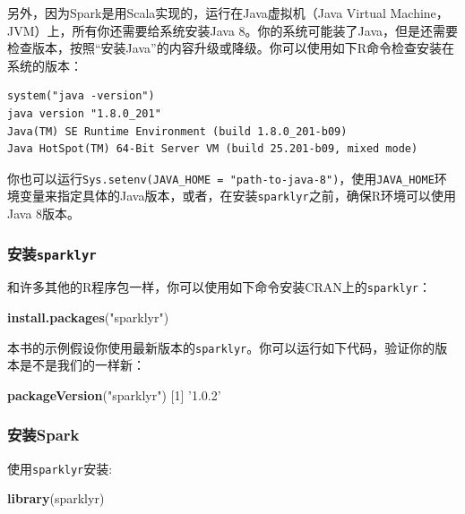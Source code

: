 \documentclass[
]{article}
\newenvironment{Shaded}{\begin{snugshade}}{\end{snugshade}}
\newcommand{\DecValTok}[1]{\textcolor[rgb]{0.00,0.00,0.81}{#1}}
\newcommand{\KeywordTok}[1]{\textcolor[rgb]{0.13,0.29,0.53}{\textbf{#1}}}
\newcommand{\NormalTok}[1]{#1}
\newcommand{\StringTok}[1]{\textcolor[rgb]{0.31,0.60,0.02}{#1}}
\begin{document}
另外，因为Spark是用Scala实现的，运行在Java虚拟机（Java Virtual
Machine，JVM）上，所有你还需要给系统安装Java
8。你的系统可能装了Java，但是还需要检查版本，按照``安装Java''的内容升级或降级。你可以使用如下R命令检查安装在系统的版本：

\begin{verbatim}
system("java -version")
java version "1.8.0_201"
Java(TM) SE Runtime Environment (build 1.8.0_201-b09)
Java HotSpot(TM) 64-Bit Server VM (build 25.201-b09, mixed mode)
\end{verbatim}

你也可以运行\texttt{Sys.setenv(JAVA\_HOME\ =\ "path-to-java-8")}，使用\texttt{JAVA\_HOME}环境变量来指定具体的Java版本，或者，在安装\texttt{sparklyr}之前，确保R环境可以使用Java
8版本。

\hypertarget{ux5b89ux88c5sparklyr}{%
\subsubsection{\texorpdfstring{安装\texttt{sparklyr}}{安装sparklyr}}\label{ux5b89ux88c5sparklyr}}

和许多其他的R程序包一样，你可以使用如下命令安装CRAN上的\texttt{sparklyr}：

\begin{Shaded}
\begin{Highlighting}[]
\KeywordTok{install.packages}\NormalTok{(}\StringTok{"sparklyr"}\NormalTok{)}
\end{Highlighting}
\end{Shaded}

本书的示例假设你使用最新版本的\texttt{sparklyr}。你可以运行如下代码，验证你的版本是不是我们的一样新：

\begin{Shaded}
\begin{Highlighting}[]
\KeywordTok{packageVersion}\NormalTok{(}\StringTok{"sparklyr"}\NormalTok{)}
\NormalTok{[}\DecValTok{1}\NormalTok{] }\StringTok{'1.0.2'}
\end{Highlighting}
\end{Shaded}

\hypertarget{ux5b89ux88c5spark}{%
\subsubsection{安装Spark}\label{ux5b89ux88c5spark}}

使用\texttt{sparklyr}安装:

\begin{Shaded}
\begin{Highlighting}[]
\KeywordTok{library}\NormalTok{(sparklyr)}
\end{Highlighting}
\end{Shaded}
\end{document}
